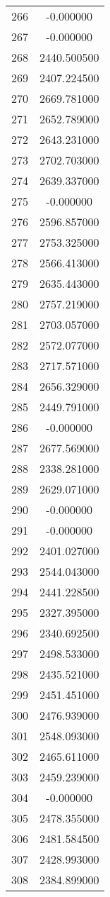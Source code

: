 \documentclass[12pt]{article}
\begin{document}
\begin{longtable}{@{}cc@{}}
266 & -0.000000 \\
267 & -0.000000 \\
268 & 2440.500500 \\
269 & 2407.224500 \\
270 & 2669.781000 \\
271 & 2652.789000 \\
272 & 2643.231000 \\
273 & 2702.703000 \\
274 & 2639.337000 \\
275 & -0.000000 \\
276 & 2596.857000 \\
277 & 2753.325000 \\
278 & 2566.413000 \\
279 & 2635.443000 \\
280 & 2757.219000 \\
281 & 2703.057000 \\
282 & 2572.077000 \\
283 & 2717.571000 \\
284 & 2656.329000 \\
285 & 2449.791000 \\
286 & -0.000000 \\
287 & 2677.569000 \\
288 & 2338.281000 \\
289 & 2629.071000 \\
290 & -0.000000 \\
291 & -0.000000 \\
292 & 2401.027000 \\
293 & 2544.043000 \\
294 & 2441.228500 \\
295 & 2327.395000 \\
296 & 2340.692500 \\
297 & 2498.533000 \\
298 & 2435.521000 \\
299 & 2451.451000 \\
300 & 2476.939000 \\
301 & 2548.093000 \\
302 & 2465.611000 \\
303 & 2459.239000 \\
304 & -0.000000 \\
305 & 2478.355000 \\
306 & 2481.584500 \\
307 & 2428.993000 \\
308 & 2384.899000 \\

\end{longtable}
\end{document}
